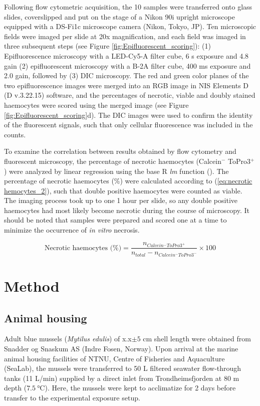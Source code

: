 Following flow cytometric acquisition, the 10 samples were transferred onto glass slides, coverslipped and put on the stage of a Nikon 90i upright microscope equipped with a DS-Fi1c microscope camera (Nikon, Tokyo, JP). Ten microscopic fields were imaged per slide at 20x magnification, and each field was imaged in three subsequent steps (see Figure \ref{fig:Epifluorescent_scoring}): (1) Epifluorescence microscopy with a LED-Cy5-A filter cube, 6 s exposure and 4.8 gain (2) epifluorescent microscopy with a B-2A filter cube, 400 ms exposure and 2.0 gain, followed by (3) DIC microscopy. The red and green color planes of the two epifluorescence images were merged into an RGB image in NIS Elements D (D v.3.22.15) software, and the percentages of necrotic, viable and doubly stained haemocytes were scored using the merged image (see Figure \ref{fig:Epifluorescent_scoring}d). The DIC images were used to confirm the identity of the fluorescent signals, such that only cellular fluorescence was included in the counts.

To examine the correlation between results obtained by flow cytometry and fluorescent microscopy, the percentage of necrotic haemocytes (Calcein$^{-}$ ToPro3$^{+}$) were analyzed by linear regression using the base R \emph{lm} function (\cite{R-project}). The percentage of necrotic haemocytes (\%) were calculated according to (\ref{eq:necrotic hemocytes_2}), such that double positive haemocytes were counted as viable. The imaging process took up to one 1 hour per slide, so any double positive haemocytes had most likely become necrotic during the course of microscopy. It should be noted that samples were prepared and scored one at a time to minimize the occurrence of \emph{in vitro} necrosis.

\begin{equation}
    \label{eq:necrotic hemocytes_2}
    \text{Necrotic haemocytes (\%)} = \dfrac{n_{Calcein^{-}ToPro3^{+}}}{n_{total} - n_{Calcein^{-}ToPro3^{-}}} \times 100
\end{equation}

\section{Method}
\subsection{Animal housing}
Adult blue mussels (\emph{Mytilus edulis}) of x.x$\pm{5}$ cm shell length were obtained from Snadder og Snaskum AS (Indre Fosen, Norway). Upon arrival at the marine animal housing facilities of NTNU, Centre of Fisheries and Aquaculture (SeaLab), the mussels were transferred to 50 L filtered seawater flow-through tanks (11 L/min) supplied by a direct inlet from Trondheimsfjorden at 80 m depth ($\SI{7.5}{\celsius}$). Here, the mussels were kept to acclimatize for 2 days before transfer to the experimental exposure setup.

